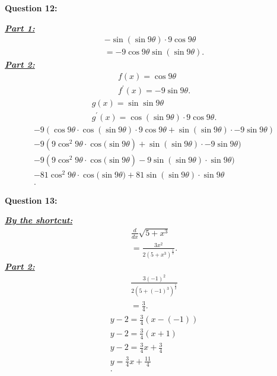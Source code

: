 \documentclass{report}
\begin{document}
    \bigbreak \noindent \bigbreak \noindent 
    \begin{Large}
        \textbf{Question 12:}
    \end{Large}
    \bigbreak \noindent 
    \bigbreak \noindent 
    \textbf{\textit{\underline{Part 1:}}}
    \begin{align*}
      -\sin{(\sin{9\theta})} \cdot 9\cos{9\theta } \\
      = -9\cos{9\theta }\sin{(\sin{9\theta })}
    .\end{align*}
    \bigbreak \noindent 
    \textbf{\textit{\underline{Part 2:}}}
    \begin{align*}
      f(x) = \cos{9\theta } \\
      f^{\prime}(x) = -9\sin{9\theta }
    .\end{align*}
    \begin{align*}
      g(x) = \sin{\sin{9\theta}} \\
      g^{\prime}(x) = \cos{(\sin{9\theta })} \cdot 9\cos{9\theta }
    .\end{align*}
    \begin{align*}
      -9(\cos{9\theta } \cdot \cos{(\sin{9\theta })\cdot 9\cos{9\theta }} + \sin{(\sin{9\theta })} \cdot  -9\sin{9\theta }) \\
      -9(9\cos^{2}{9\theta } \cdot \cos{(\sin{9\theta }})+ \sin{(\sin{9\theta })} \cdot  -9\sin{9\theta }) \\
      -9(9\cos^{2}{9\theta } \cdot \cos{(\sin{9\theta }})-9\sin{(\sin{9\theta })} \cdot \sin{9\theta }) \\
      -81\cos^{2}{9\theta } \cdot \cos{(\sin{9\theta }})+81\sin{(\sin{9\theta })} \cdot \sin{9\theta } \\
    .\end{align*}


    \bigbreak \noindent \bigbreak \noindent 
    \begin{Large}
        \textbf{Question 13:}
    \end{Large}
    \bigbreak \noindent 
    \bigbreak \noindent 
    \textbf{\textit{\underline{By the shortcut:}}}
    \begin{align*}
      \frac{d}{dx}\sqrt{5+x^{3}} \\
      = \frac{3x^{2}}{2(5+x^{3})^{\frac{1}{2}}}
    .\end{align*}
    \textbf{\textit{\underline{Part 2:}}}
    \begin{align*}
      \frac{3(-1)^{2}}{2(5+(-1)^{3})^{\frac{1}{2}}} \\
      = \frac{3}{4}
    .\end{align*}
    \begin{align*}
      y - 2 = \frac{3}{4}(x-(-1)) \\
      y - 2 = \frac{3}{4}(x+1) \\
      y - 2 = \frac{3}{4}x+\frac{3}{4} \\
      y = \frac{3}{4}x+\frac{11}{4} \\
    .\end{align*}
\end{document}
